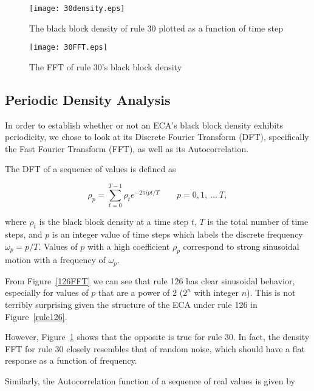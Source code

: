 \begin{figure}
    \begin{minipage}[b]{0.49\textwidth}
        \centering
        \texttt{[image: 30density.eps]}
        \caption{\label{30density} The black block density of rule 30 plotted as a function of time step}
    \end{minipage}
    \hspace{0.5cm}
    \begin{minipage}[b]{0.49\textwidth}
        \centering
        \texttt{[image: 30FFT.eps]}
        \caption{\label{30FFT} The FFT of rule 30's black block density}
    \end{minipage}
\end{figure}


\subsection{Periodic Density Analysis}
In order to establish whether or not an ECA's black block density
exhibits periodicity, we chose to look at its Discrete Fourier
Transform (DFT), specifically the Fast Fourier Transform (FFT), as
well as its Autocorrelation.

The DFT of a sequence of values is defined as

\begin{equation}
    \rho_p = \sum_{t=0}^{T-1} \rho_t e^{-2\pi i pt/T} \qquad p =
    0, 1,\ \ldots\ T,
\end{equation}

\noindent where $\rho_t$ is the black block density at a time step
$t$, $T$ is the total number of time steps, and $p$ is an integer
value of time steps which labels the discrete frequency
$\omega_p = p/T$.
Values of $p$ with a high coefficient $\rho_p$ correspond to strong
sinusoidal motion with a frequency of $\omega_p$.

From Figure~\ref{126FFT} we can see that rule 126 has clear sinusoidal
behavior, especially for values of $p$ that are a power of 2 ($2^n$
with integer $n$).
This is not terribly surprising given the structure of the ECA under
rule 126 in Figure~\ref{rule126}.

However, Figure~\ref{30FFT} shows that the opposite is true for rule
30.
In fact, the density FFT for rule 30 closely resembles that of random
noise, which should have a flat response as a function of frequency.

Similarly, the Autocorrelation function of a sequence of real values
is given by

